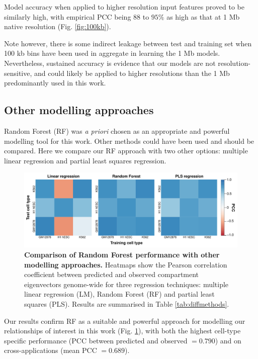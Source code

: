 \documentclass[a4paper,11pt,oneside]{book}
\begin{document}
Model accuracy when applied to higher resolution input features proved to be similarly high, with empirical PCC being $88$ to $95\%$ as high as that at 1 Mb native resolution (Fig. \ref{fig:100kb}).

Note however, there is some indirect leakage between test and training set when 100 kb bins have been used in aggregate in learning the 1 Mb models. Nevertheless, sustained accuracy is evidence that our models are not resolution-sensitive, and could likely be applied to higher resolutions than the 1 Mb predominantly used in this work.

\subsection{Other modelling approaches}

Random Forest (RF) was \emph{a priori} chosen as an appropriate and powerful modelling tool for this work. Other methods could have been used and should be compared. Here we compare our RF approach with two other options: multiple linear regression and partial least squares regression.

\begin{figure}
\begin{center} 
\includegraphics[width=1.2\textwidth]{figs/diffmethods.pdf}
\captionsetup{width=1.2\textwidth} 
\caption{ {\bf Comparison of Random Forest performance with other modelling approaches. }
Heatmaps show the Pearson correlation coefficient between predicted and observed compartment eigenvectors genome-wide for three regression techniques: multiple linear regression (LM), Random Forest (RF) and partial least squares (PLS). Results are summarised in Table \ref{tab:diffmethods}.
}\label{fig:diffmethods}
\end{center} 
\end{figure} 

Our results confirm RF as a suitable and powerful approach for modelling our relationships of interest in this work (Fig. \ref{fig:diffmethods}), with both the highest cell-type specific performance (PCC between predicted and observed $=0.790$) and on cross-applications (mean PCC $= 0.689$). 
\end{document}
